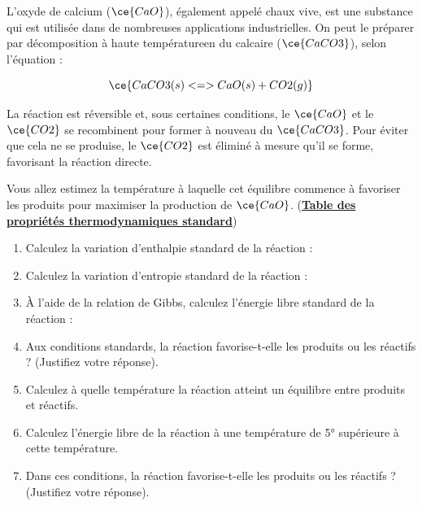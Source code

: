\documentclass[
  11pt,
  french,
  a4paper,
  openany]{book}
\providecommand{\tightlist}{%
  \setlength{\itemsep}{0pt}\setlength{\parskip}{0pt}}
\begin{document}
\begin{Exercise}

L'oxyde de calcium (\(\ce{CaO}\)), également appelé chaux vive, est une substance qui est utilisée dans de nombreuses applications industrielles. On peut le préparer par décomposition à haute températureen du calcaire (\(\ce{CaCO3}\)), selon l'équation :

\[ \ce{CaCO3(s) <=> CaO(s) + CO2(g)} \]

La réaction est réversible et, sous certaines conditions, le \(\ce{CaO}\) et le \(\ce{CO2}\) se recombinent pour former à nouveau du \(\ce{CaCO3}\). Pour éviter que cela ne se produise, le \(\ce{CO2}\) est éliminé à mesure qu'il se forme, favorisant la réaction directe.

Vous allez estimez la température à laquelle cet équilibre commence à favoriser les produits pour maximiser la production de \(\ce{CaO}\). (\href{https://bit.ly/GNLC-TPTS}{\textbf{Table des propriétés thermodynamiques standard}})

\begin{enumerate}
\def\labelenumi{\arabic{enumi}.}
\tightlist
\item
  Calculez la variation d'enthalpie standard de la réaction : 
\item
  Calculez la variation d'entropie standard de la réaction : 
\item
  À l'aide de la relation de Gibbs, calculez l'énergie libre standard de la réaction : 
\item
  Aux conditions standards, la réaction favorise-t-elle les produits ou les réactifs ? (Justifiez votre réponse). 
\item
  Calculez à quelle température la réaction atteint un équilibre entre produits et réactifs. 
\item
  Calculez l'énergie libre de la réaction à une température de 5° supérieure à cette température. 
\item
  Dans ces conditions, la réaction favorise-t-elle les produits ou les réactifs ? (Justifiez votre réponse). 
\end{enumerate}


\end{Exercise}
\end{document}

